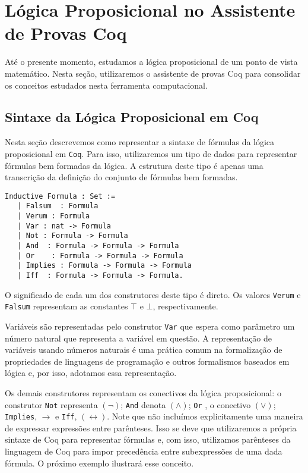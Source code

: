 \section{Lógica Proposicional no Assistente de Provas Coq}

Até o presente momento, estudamos a lógica proposicional de um ponto
de vista matemático. Nesta seção, utilizaremos o assistente de provas
Coq para consolidar os conceitos estudados nesta ferramenta
computacional.

\subsection{Sintaxe da Lógica Proposicional em Coq}\label{proplogiccoqsyntax}

Nesta seção descrevemos como representar a sintaxe de fórmulas da
lógica proposicional em \texttt{Coq}. Para isso, utilizaremos um tipo de dados
para representar fórmulas bem formadas da lógica. A
estrutura deste tipo é apenas uma transcrição da definição do conjunto
de fórmulas bem formadas.

\begin{lstlisting}
Inductive Formula : Set :=
   | Falsum  : Formula
   | Verum : Formula
   | Var : nat -> Formula
   | Not : Formula -> Formula
   | And  : Formula -> Formula -> Formula
   | Or    : Formula -> Formula -> Formula
   | Implies : Formula -> Formula -> Formula
   | Iff  : Formula -> Formula -> Formula.
\end{lstlisting}
O significado de cada um dos construtores deste tipo é direto. Os
valores \texttt{Verum} e \texttt{Falsum} representam as constantes
$\top$ e $\bot$, respectivamente.

Variáveis são representadas pelo
construtor \texttt{Var} que espera como parâmetro um
número natural que representa a variável em questão. A representação de
variáveis usando números naturais é uma prática comum na formalização de propriedades de
linguagens de programação e outros formalismos baseados em lógica e,
por isso, adotamos essa representação.

Os demais construtores representam os conectivos da lógica
proposicional: o construtor \texttt{Not} representa $(\neg)$;
\texttt{And} denota $(\land)$; \texttt{Or} , o conectivo $(\lor)$; \texttt{Implies},
$\to$ e \texttt{Iff}, $(\leftrightarrow)$. Note que não incluímos
explicitamente uma maneira de expressar expressões entre
parênteses. Isso se deve que utilizaremos a própria sintaxe de Coq
para representar fórmulas e, com isso, utilizamos parênteses da
linguagem de Coq para impor precedência entre subexpressões de uma
dada fórmula. O próximo exemplo ilustrará esse conceito.

